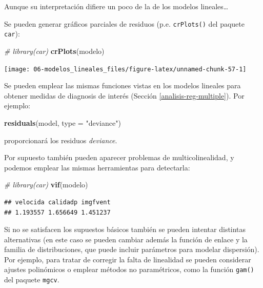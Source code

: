 \documentclass[
]{book}
\newenvironment{Shaded}{\begin{snugshade}}{\end{snugshade}}
\newcommand{\CommentTok}[1]{\textcolor[rgb]{0.56,0.35,0.01}{\textit{#1}}}
\newcommand{\DataTypeTok}[1]{\textcolor[rgb]{0.13,0.29,0.53}{#1}}
\newcommand{\KeywordTok}[1]{\textcolor[rgb]{0.13,0.29,0.53}{\textbf{#1}}}
\newcommand{\NormalTok}[1]{#1}
\newcommand{\StringTok}[1]{\textcolor[rgb]{0.31,0.60,0.02}{#1}}
\theoremstyle{break}
\theoremstyle{definition}
\theoremstyle{definition}
\theoremstyle{definition}
\theoremstyle{remark}
\begin{document}
Aunque su interpretación difiere un poco de la de los modelos lineales\ldots{}

Se pueden generar gráficos parciales de residuos (p.e. \texttt{crPlots()} del paquete \texttt{car}):

\begin{Shaded}
\begin{Highlighting}[]
\CommentTok{# library(car)}
\KeywordTok{crPlots}\NormalTok{(modelo)}
\end{Highlighting}
\end{Shaded}

\begin{center}\texttt{[image: 06-modelos\_lineales\_files/figure-latex/unnamed-chunk-57-1]} \end{center}

Se pueden emplear las mismas funciones vistas en los modelos lineales para obtener medidas de diagnosis de interés (Sección \ref{analisis-reg-multiple}). Por ejemplo:

\begin{Shaded}
\begin{Highlighting}[]
\KeywordTok{residuals}\NormalTok{(model, }\DataTypeTok{type =} \StringTok{"deviance"}\NormalTok{)}
\end{Highlighting}
\end{Shaded}

proporcionará los residuos \emph{deviance}.

Por supuesto también pueden aparecer problemas de multicolinealidad, y podemos emplear las mismas herramientas para detectarla:

\begin{Shaded}
\begin{Highlighting}[]
\CommentTok{# library(car)}
\KeywordTok{vif}\NormalTok{(modelo)}
\end{Highlighting}
\end{Shaded}

\begin{verbatim}
## velocida calidadp imgfvent 
## 1.193557 1.656649 1.451237
\end{verbatim}

Si no se satisfacen los supuestos básicos también se pueden intentar distintas alternativas (en este caso se pueden cambiar además la función de enlace y la familia de distribuciones, que puede incluir parámetros para modelar dispersión).
Por ejemplo, para tratar de corregir la falta de linealidad se pueden considerar ajustes polinómicos o emplear métodos no paramétricos, como la función \texttt{gam()} del paquete \texttt{mgcv}.
\end{document}
